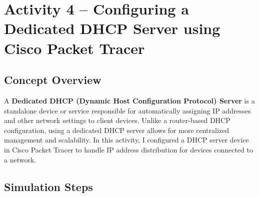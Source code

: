 \documentclass[11pt,a4paper]{article}
\begin{document}
\section{Activity 4 – Configuring a Dedicated DHCP Server using Cisco Packet Tracer}

\subsection{Concept Overview}

A \textbf{Dedicated DHCP (Dynamic Host Configuration Protocol) Server} is a standalone device or service responsible for automatically assigning IP addresses and other network settings to client devices. Unlike a router-based DHCP configuration, using a dedicated DHCP server allows for more centralized management and scalability. In this activity, I configured a DHCP server device in Cisco Packet Tracer to handle IP address distribution for devices connected to a network.

\subsection{Simulation Steps}
\end{document}
